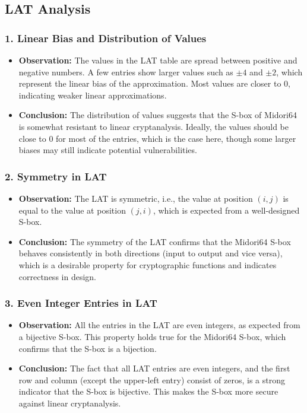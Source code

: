 \subsection*{LAT Analysis}

\subsubsection*{1. Linear Bias and Distribution of Values}
\begin{itemize}
	\item \textbf{Observation:} The values in the LAT table are spread between
	      positive and negative numbers. A few entries show larger values such as $\pm
		      4$ and $\pm 2$, which represent the linear bias of the approximation. Most
	      values are closer to 0, indicating weaker linear approximations.
	\item \textbf{Conclusion:} The distribution of values suggests that the
	      S-box of Midori64 is somewhat resistant to linear cryptanalysis. Ideally,
	      the values should be close to 0 for most of the entries, which is the case
	      here, though some larger biases may still indicate potential
	      vulnerabilities.
\end{itemize}

\subsubsection*{2. Symmetry in LAT}
\begin{itemize}
	\item \textbf{Observation:} The LAT is symmetric, i.e., the value at
	      position $(i, j)$ is equal to the value at position $(j, i)$, which is
	      expected from a well-designed S-box.
	\item \textbf{Conclusion:} The symmetry of the LAT confirms that the
	      Midori64 S-box behaves consistently in both directions (input to output and
	      vice versa), which is a desirable property for cryptographic functions and
	      indicates correctness in design.
\end{itemize}

\subsubsection*{3. Even Integer Entries in LAT}
\begin{itemize}
	\item \textbf{Observation:} All the entries in the LAT are even integers, as
	      expected from a bijective S-box. This property holds true for the Midori64
	      S-box, which confirms that the S-box is a bijection.
	\item \textbf{Conclusion:} The fact that all LAT entries are even integers,
	      and the first row and column (except the upper-left entry) consist of zeros,
	      is a strong indicator that the S-box is bijective. This makes the S-box more
	      secure against linear cryptanalysis.
\end{itemize}

